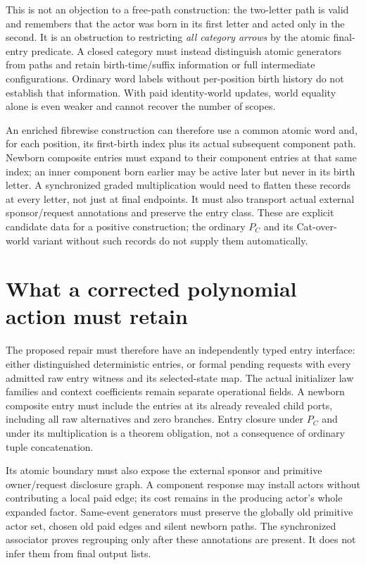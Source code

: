 \documentclass[11pt]{article}
\begin{document}
This is not an objection to a free-path construction: the two-letter path is valid and remembers that the actor was born in its first letter and acted only in the second. It is an obstruction to restricting \emph{all category arrows} by the atomic final-entry predicate. A closed category must instead distinguish atomic generators from paths and retain birth-time/suffix information or full intermediate configurations. Ordinary word labels without per-position birth history do not establish that information. With paid identity-world updates, world equality alone is even weaker and cannot recover the number of scopes.

An enriched fibrewise construction can therefore use a common atomic word and, for each position, its first-birth index plus its actual subsequent component path. Newborn composite entries must expand to their component entries at that same index; an inner component born earlier may be active later but never in its birth letter. A synchronized graded multiplication would need to flatten these records at every letter, not just at final endpoints. It must also transport actual external sponsor/request annotations and preserve the entry class. These are explicit candidate data for a positive construction; the ordinary $P_C$ and its Cat-over-world variant without such records do not supply them automatically.

\section{What a corrected polynomial action must retain}
The proposed repair must therefore have an independently typed entry interface: either distinguished deterministic entries, or formal pending requests with every admitted raw entry witness and its selected-state map. The actual initializer law families and context coefficients remain separate operational fields. A newborn composite entry must include the entries at its already revealed child ports, including all raw alternatives and zero branches. Entry closure under $P_C$ and under its multiplication is a theorem obligation, not a consequence of ordinary tuple concatenation.

Its atomic boundary must also expose the external sponsor and primitive owner/request disclosure graph. A component response may install actors without contributing a local paid edge; its cost remains in the producing actor's whole expanded factor. Same-event generators must preserve the globally old primitive actor set, chosen old paid edges and silent newborn paths. The synchronized associator proves regrouping only after these annotations are present. It does not infer them from final output lists.
\end{document}
